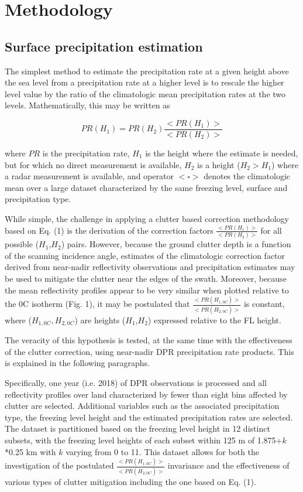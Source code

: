 \documentclass{article}
\begin{document}
    
\section*{Methodology}
\subsection*{Surface precipitation estimation}
    
The simplest method to estimate the precipitation rate at a given height
above the sea level from a precipitation rate at a higher level is to
rescale the higher level value by the ratio of the climatologic mean
precipitation rates at the two levels. Mathematically, this may be
written as
    
    \begin{equation}
    PR(H_1)=PR(H_2) \frac {<PR(H_1)>} {<PR(H_2)>} 
    \end{equation}

where $PR$ is the precipitation rate, $H_1$ is the height where the
estimate is needed, but for which no direct measurement is available,
$H_2$ is a height ($H_2>H_1$) where a radar
measurement is available, and operator $<\square>$ denotes the
climatologic mean over a large dataset characterized by the same
freezing level, surface and precipitation type.
    
While simple, the challenge in applying a clutter based correction
methodology based on Eq. (1) is the derivation of the correction factors
$\frac {<PR(H_1)>} {<PR(H_2)>}$ for all possible ($H_1$,$H_2$)
pairs. However, because the ground clutter depth is a function of the
scanning incidence angle, estimates of the climatologic correction
factor derived from near-nadir reflectivity observations and
precipitation estimates may be used to mitigate the clutter near the
edges of the swath. Moreover, because the mean reflectivity profiles
appear to be very similar when plotted relative to the 0C isotherm (Fig. 1), it may be postulated that 
$\frac {<PR(H_{1,0C})>} {<PR(H_{2,0C})>}$
is constant, where
($H_{1,0C},H_{2,0C}$) are heights ($H_1$,$H_2$) expressed
relative to the FL height.
    
The veracity of this hypothesis is tested, at the same time with the
effectiveness of the clutter correction, using near-nadir DPR
precipitation rate products. This is explained in the following
paragraphs.
    
Specifically, one year (i.e. 2018) of DPR observations is processed and
all reflectivity profiles over land characterized by fewer than eight
bins affected by clutter are selected. Additional variables such as the
associated precipitation type, the freezing level height and the
estimated precipitation rates are selected. The dataset is partitioned
based on the freezing level height in 12 distinct subsets, with the
freezing level heights of each subset within 125 m of 1.875+$k$*0.25
km with $k$ varying from 0 to 11. This dataset allows for both the
investigation of the postulated
$\frac {<PR(H_{1,0C})>} {<PR(H_{2,0C})>}$ invariance and the
effectiveness of various types of clutter mitigation including 
the one based on Eq. (1).
    
\end{document}
